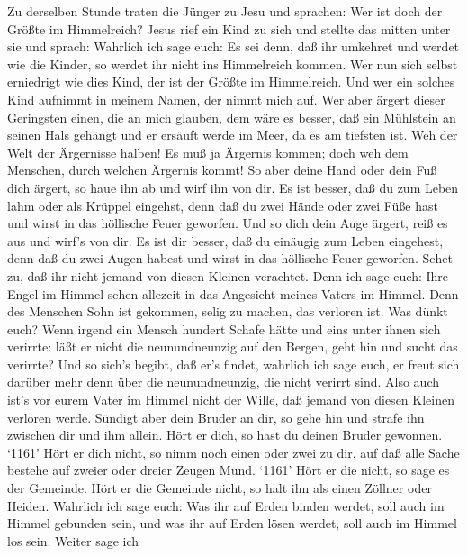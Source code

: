  Zu derselben Stunde traten die Jünger zu Jesu und sprachen:
Wer ist doch der Größte im Himmelreich?  Jesus rief ein Kind
zu sich und stellte das mitten unter sie  und sprach:
Wahrlich ich sage euch: Es sei denn, daß ihr umkehret und werdet wie die
Kinder, so werdet ihr nicht ins Himmelreich kommen.  Wer nun
sich selbst erniedrigt wie dies Kind, der ist der Größte im Himmelreich.
 Und wer ein solches Kind aufnimmt in meinem Namen, der
nimmt mich auf.  Wer aber ärgert dieser Geringsten einen,
die an mich glauben, dem wäre es besser, daß ein Mühlstein an seinen
Hals gehängt und er ersäuft werde im Meer, da es am tiefsten ist.
 Weh der Welt der Ärgernisse halben! Es muß ja Ärgernis
kommen; doch weh dem Menschen, durch welchen Ärgernis kommt!
 So aber deine Hand oder dein Fuß dich ärgert, so haue ihn
ab und wirf ihn von dir. Es ist besser, daß du zum Leben lahm oder als
Krüppel eingehst, denn daß du zwei Hände oder zwei Füße hast und wirst
in das höllische Feuer geworfen.  Und so dich dein Auge
ärgert, reiß es aus und wirf's von dir. Es ist dir besser, daß du
einäugig zum Leben eingehest, denn daß du zwei Augen habest und wirst in
das höllische Feuer geworfen.  Sehet zu, daß ihr nicht
jemand von diesen Kleinen verachtet. Denn ich sage euch: Ihre Engel im
Himmel sehen allezeit in das Angesicht meines Vaters im Himmel.
 Denn des Menschen Sohn ist gekommen, selig zu machen, das
verloren ist.  Was dünkt euch? Wenn irgend ein Mensch
hundert Schafe hätte und eins unter ihnen sich verirrte: läßt er nicht
die neunundneunzig auf den Bergen, geht hin und sucht das verirrte?
 Und so sich's begibt, daß er's findet, wahrlich ich sage
euch, er freut sich darüber mehr denn über die neunundneunzig, die nicht
verirrt sind.  Also auch ist's vor eurem Vater im Himmel
nicht der Wille, daß jemand von diesen Kleinen verloren werde.
 Sündigt aber dein Bruder an dir, so gehe hin und strafe
ihn zwischen dir und ihm allein. Hört er dich, so hast du deinen Bruder
gewonnen.  `1161' Hört er dich nicht, so nimm noch einen
oder zwei zu dir, auf daß alle Sache bestehe auf zweier oder dreier
Zeugen Mund.  `1161' Hört er die nicht, so sage es der
Gemeinde. Hört er die Gemeinde nicht, so halt ihn als einen Zöllner oder
Heiden.  Wahrlich ich sage euch: Was ihr auf Erden binden
werdet, soll auch im Himmel gebunden sein, und was ihr auf Erden lösen
werdet, soll auch im Himmel los sein.  Weiter sage ich
